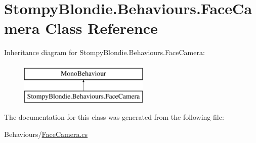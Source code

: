 \hypertarget{class_stompy_blondie_1_1_behaviours_1_1_face_camera}{}\section{Stompy\+Blondie.\+Behaviours.\+Face\+Camera Class Reference}
\label{class_stompy_blondie_1_1_behaviours_1_1_face_camera}
Inheritance diagram for Stompy\+Blondie.\+Behaviours.\+Face\+Camera\+:\begin{figure}[H]
\begin{center}
\leavevmode
\includegraphics[height=2.000000cm]{class_stompy_blondie_1_1_behaviours_1_1_face_camera}
\end{center}
\end{figure}


The documentation for this class was generated from the following file\+:\begin{DoxyCompactItemize}
\item 
Behaviours/\mbox{\hyperlink{_face_camera_8cs}{Face\+Camera.\+cs}}\end{DoxyCompactItemize}
